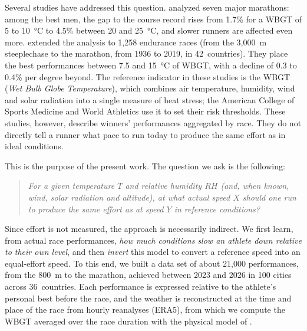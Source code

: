 \documentclass[11pt,a4paper]{article}
\begin{document}
Several studies have addressed this question. \citet{ely2007} analyzed seven major marathons: among the best men, the
gap to the course record rises from 1.7\% for a WBGT of 5 to 10~°C to 4.5\% between 20 and 25~°C, and slower runners
are affected even more. \citet{mantzios2022} extended the analysis to 1,258 endurance races (from the 3,000~m
steeplechase to the marathon, from 1936 to 2019, in 42~countries). They place the best performances between 7.5 and
15~°C of WBGT, with a decline of 0.3 to 0.4\% per degree beyond. The reference indicator in these studies is the WBGT
(\emph{Wet Bulb Globe Temperature}), which combines air temperature, humidity, wind and solar radiation into a single
measure of heat stress; the American College of Sports Medicine and World Athletics use it to set their risk
thresholds. These studies, however, describe winners' performances aggregated by race. They do not directly tell a
runner what pace to run today to produce the same effort as in ideal conditions.

This is the purpose of the present work. The question we ask is the following:
\begin{quote}
\itshape For a given temperature $T$ and relative humidity $RH$ (and, when known, wind, solar radiation and altitude),
at what actual speed $X$ should one run to produce the same effort as at speed $Y$ in reference conditions?
\end{quote}
Since effort is not measured, the approach is necessarily indirect. We first learn, from actual race performances,
\emph{how much conditions slow an athlete down relative to their own level}, and then \emph{invert} this model to
convert a reference speed into an equal-effort speed. To this end, we built a data set of about 21,000 performances,
from the 800~m to the marathon, achieved between 2023 and 2026 in 100 cities across 36~countries. Each performance is
expressed relative to the athlete's personal best before the race, and the weather is reconstructed at the time and
place of the race from hourly reanalyses (ERA5), from which we compute the WBGT averaged over the race duration with
the physical model of \citet{liljegren2008}.
\end{document}
